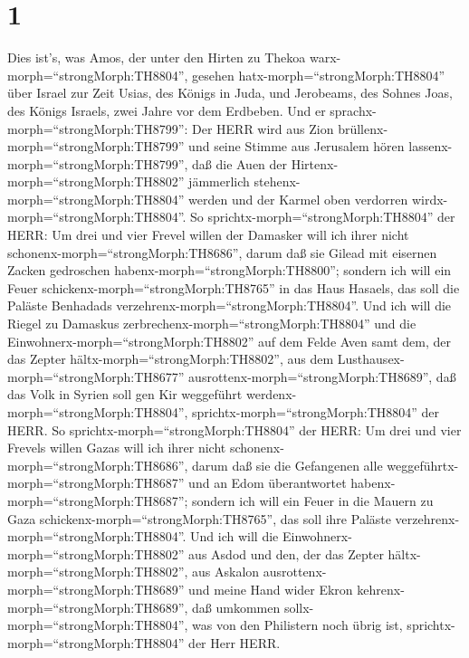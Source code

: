 \hypertarget{section}{%
\section{1}\label{section}}

 Dies ist's, was Amos, der unter den Hirten zu Thekoa
warx-morph=``strongMorph:TH8804'', gesehen
hatx-morph=``strongMorph:TH8804'' über Israel zur Zeit Usias, des Königs
in Juda, und Jerobeams, des Sohnes Joas, des Königs Israels, zwei Jahre
vor dem Erdbeben.  Und er
sprachx-morph=``strongMorph:TH8799'': Der HERR wird aus Zion
brüllenx-morph=``strongMorph:TH8799'' und seine Stimme aus Jerusalem
hören lassenx-morph=``strongMorph:TH8799'', daß die Auen der
Hirtenx-morph=``strongMorph:TH8802'' jämmerlich
stehenx-morph=``strongMorph:TH8804'' werden und der Karmel oben
verdorren wirdx-morph=``strongMorph:TH8804''.  So
sprichtx-morph=``strongMorph:TH8804'' der HERR: Um drei und vier Frevel
willen der Damasker will ich ihrer nicht
schonenx-morph=``strongMorph:TH8686'', darum daß sie Gilead mit eisernen
Zacken gedroschen habenx-morph=``strongMorph:TH8800''; 
sondern ich will ein Feuer schickenx-morph=``strongMorph:TH8765'' in das
Haus Hasaels, das soll die Paläste Benhadads
verzehrenx-morph=``strongMorph:TH8804''.  Und ich will die
Riegel zu Damaskus zerbrechenx-morph=``strongMorph:TH8804'' und die
Einwohnerx-morph=``strongMorph:TH8802'' auf dem Felde Aven samt dem, der
das Zepter hältx-morph=``strongMorph:TH8802'', aus dem
Lusthausex-morph=``strongMorph:TH8677''
ausrottenx-morph=``strongMorph:TH8689'', daß das Volk in Syrien soll gen
Kir weggeführt werdenx-morph=``strongMorph:TH8804'',
sprichtx-morph=``strongMorph:TH8804'' der HERR.  So
sprichtx-morph=``strongMorph:TH8804'' der HERR: Um drei und vier Frevels
willen Gazas will ich ihrer nicht schonenx-morph=``strongMorph:TH8686'',
darum daß sie die Gefangenen alle
weggeführtx-morph=``strongMorph:TH8687'' und an Edom überantwortet
habenx-morph=``strongMorph:TH8687'';  sondern ich will ein
Feuer in die Mauern zu Gaza schickenx-morph=``strongMorph:TH8765'', das
soll ihre Paläste verzehrenx-morph=``strongMorph:TH8804''. 
Und ich will die Einwohnerx-morph=``strongMorph:TH8802'' aus Asdod und
den, der das Zepter hältx-morph=``strongMorph:TH8802'', aus Askalon
ausrottenx-morph=``strongMorph:TH8689'' und meine Hand wider Ekron
kehrenx-morph=``strongMorph:TH8689'', daß umkommen
sollx-morph=``strongMorph:TH8804'', was von den Philistern noch übrig
ist, sprichtx-morph=``strongMorph:TH8804'' der Herr HERR. 
